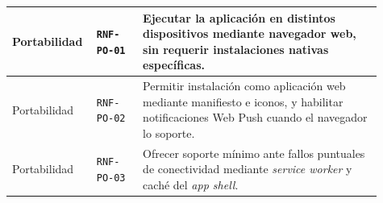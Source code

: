 {\begin{supertabular}{|>{\raggedright\arraybackslash}p{0.17\linewidth}|>{\raggedright\arraybackslash}p{0.12\linewidth}|>{\raggedright\arraybackslash}p{0.62\linewidth}|}
\hline
{}
Portabilidad & \texttt{RNF-PO-01} & Ejecutar la aplicación en distintos dispositivos mediante navegador web, sin requerir instalaciones nativas específicas. \\
\hline
Portabilidad & \texttt{RNF-PO-02} & Permitir instalación como aplicación web mediante manifiesto e iconos, y habilitar notificaciones Web Push cuando el navegador lo soporte. \\
\hline
Portabilidad & \texttt{RNF-PO-03} & Ofrecer soporte mínimo ante fallos puntuales de conectividad mediante \textit{service worker} y caché del \textit{app shell}. \\
\hline
\end{supertabular}
}
